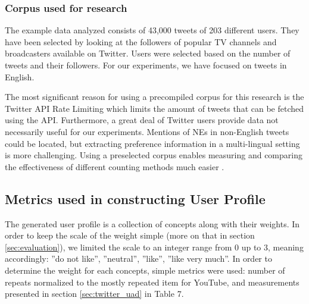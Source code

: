 \subsubsection{Corpus used for research}

The example data analyzed consists of 43,000 tweets of 203 different users.
They have been selected by looking at the followers of popular TV channels and broadcasters
available on Twitter. Users were selected based on the number of tweets and their followers.
For our experiments, we have focused on tweets in English.

The most significant reason for using a precompiled corpus for this research is the Twitter API
Rate Limiting which limits the amount of tweets that can be fetched using the API.
Furthermore, a great deal of Twitter users provide data not necessarily
useful for our experiments. Mentions of NEs in non-English tweets could be located, but
extracting preference information in a multi-lingual setting is more challenging.
Using a preselected corpus enables measuring and comparing the effectiveness of different
counting methods much easier \cite{short-tweet}.

\subsection{Metrics used in constructing User Profile}

The generated user profile is a collection of concepts along with their
weights. In order to keep the scale of the weight simple (more on that in section
\ref{sec:evaluation}), we limited the scale to an integer range from 0
up to 3, meaning accordingly: ''do not like'', ''neutral'', ''like'', ''like
very much''. In order to determine the weight for each concepts, simple metrics
were used: number of repeats normalized to the mostly repeated item for
YouTube, and measurements presented in section \ref{sec:twitter_uad} in Table 7.

